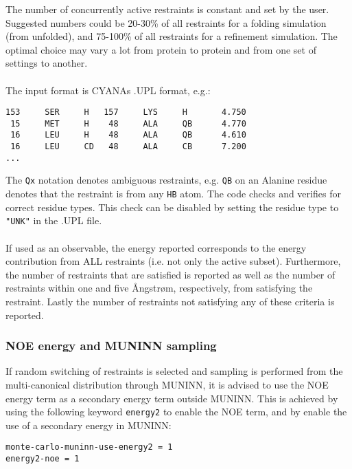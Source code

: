 The number of concurrently active restraints is constant and set by the user.
Suggested numbers could be 20-30\% of all restraints for a folding simulation (from unfolded), and 75-100\% of all restraints for a refinement simulation.
The optimal choice may vary a lot from protein to protein and from one set of settings to another.
\\\\The input format is CYANAs .UPL format, e.g.:
\begin{verbatim}
153     SER     H   157     LYS     H       4.750
 15     MET     H    48     ALA     QB      4.770
 16     LEU     H    48     ALA     QB      4.610
 16     LEU     CD   48     ALA     CB      7.200
...
\end{verbatim}
The \texttt{Qx} notation denotes ambiguous restraints, e.g. \texttt{QB} on an Alanine residue denotes that the restraint is from any \texttt{HB} atom.
The code checks and verifies for correct residue types.
This check can be disabled by setting the residue type to \texttt{"UNK"} in the .UPL file. 
\\\\If used as an observable, the energy reported corresponds to the energy contribution from ALL restraints (i.e. not only the active subset).
Furthermore, the number of restraints that are satisfied is reported as well as the number of restraints within one and five \AA ngstr\o m, respectively, from satisfying the restraint.
Lastly the number of restraints not satisfying any of these criteria is reported.

\subsubsection*{NOE energy and MUNINN sampling}
If random switching of restraints is selected and sampling is performed from the multi-canonical distribution through MUNINN, it is advised to use the NOE energy term as a secondary energy term outside MUNINN. 
This is achieved by using the following keyword \texttt{energy2} to enable the NOE term, and by enable the use of a secondary energy in MUNINN:
\begin{verbatim}
monte-carlo-muninn-use-energy2 = 1
energy2-noe = 1
\end{verbatim}
\begin{optiontable}
\end{optiontable}
